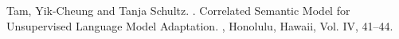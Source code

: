 \documentclass[11pt]{article}
\begin{document}
\begin{thebibliography}{}
Tam, Yik-Cheung and Tanja Schultz.
.
\newblock Correlated  Semantic Model for
  Unsupervised Language Model Adaptation.
, Honolulu, Hawaii, Vol. IV, 41--44.

\end{thebibliography}
\end{document}
